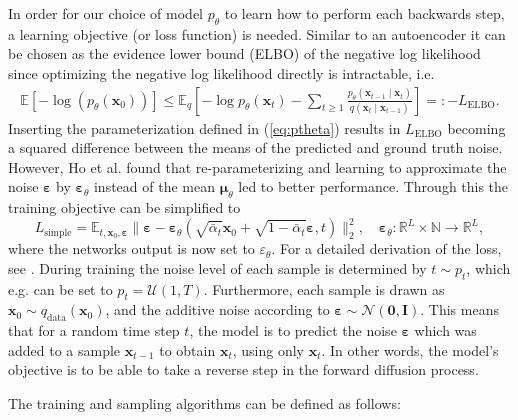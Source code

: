 \documentclass{report}
\begin{document}
In order for our choice of model $p_{\theta}$ to learn how to perform each backwards step, a learning objective (or loss function) is needed. Similar to an autoencoder \cite{goodfellow2016deep} it can be chosen as the evidence lower bound (ELBO) of the negative log likelihood since optimizing the negative log likelihood directly is intractable, i.e.
\begin{align}
\label{vlb1}
    \mathbb{E}[-\log(p_\theta(\bm{x}_0))] \leq \mathbb{E}_q \left[ -\log p_\theta(\bm{x}_t) - \sum_{t\geq 1} \frac{p_\theta(\bm{x}_{t-1}\mid\bm{x}_t)}{q(\bm{x}_t\mid\bm{x}_{t-1})} \right] =: -L_{\text{ELBO}}.
\end{align}
Inserting the parameterization defined in (\ref{eq:ptheta}) results in $L_{\text{ELBO}}$ becoming a squared difference between the means of the predicted and ground truth noise. However, Ho et al. \cite{ho2020denoising} found that re-parameterizing and learning to approximate the noise $\bm{\varepsilon}$ by $\bm{\varepsilon}_\theta$ instead of the mean $\bm{\mu}_\theta$ led to better performance. Through this the training objective can be simplified to
\begin{equation} \label{eq:trainsimple}
    L_{\text{simple}} = \mathbb{E}_{t, \bm{x}_0, \bm{\varepsilon}} \|\bm{\varepsilon} - \bm{\varepsilon}_\theta(\sqrt{\bar{\alpha}_t} \bm{x}_0 + \sqrt{1-\bar{\alpha}_t} \bm{\varepsilon}, t)\|^2_2, \quad \bm{\varepsilon}_{\theta}: \mathbb{R}^{L}\times \mathbb{N} \rightarrow \mathbb{R}^{L},
\end{equation}
where the networks output is now set to $\varepsilon_{\theta}$. For a detailed derivation of the loss, see \cite{kong2020diffwave}. During training the noise level of each sample is determined by $t \sim p_t$, which e.g. can be set to $p_t = \mathcal{U}(1, T)$. Furthermore, each sample is drawn as $\bm{x}_0 \sim q_{\text{data}}(\bm{x}_0)$, and the additive noise according to $\bm{\varepsilon} \sim \mathcal{N}(\bm{0}, \bm{I})$. This means that for a random time step $t$, the model is to predict the noise $\bm{\varepsilon}$ which was added to a sample $\bm{x}_{t-1}$ to obtain $\bm{x}_t$, using only $\bm{x}_t$. In other words, the model's objective is to be able to take a reverse step in the forward diffusion process.


The training and sampling algorithms can be defined as follows:
\end{document}
